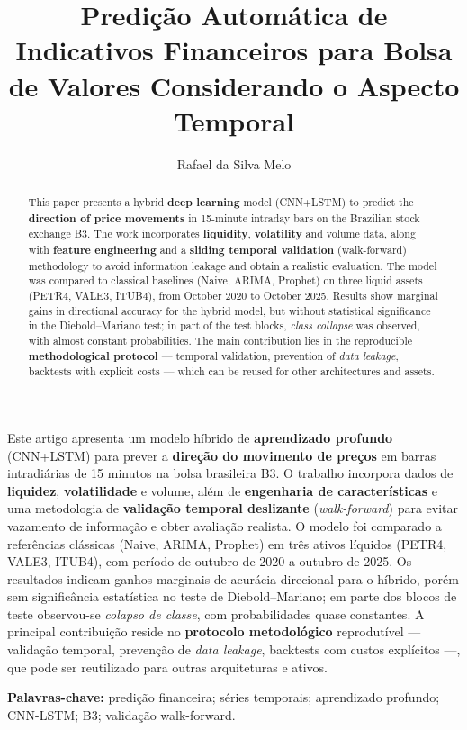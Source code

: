 \documentclass[12pt]{article}
\title{Predição Automática de Indicativos Financeiros para Bolsa de Valores Considerando o Aspecto Temporal}
\author{Rafael da Silva Melo\inst{1}}
\begin{document}
\maketitle

\begin{abstract}
  This paper presents a hybrid \textbf{deep learning} model (CNN+LSTM) to predict the \textbf{direction of price movements} in 15-minute intraday bars on the Brazilian stock exchange B3. The work incorporates \textbf{liquidity}, \textbf{volatility} and volume data, along with \textbf{feature engineering} and a \textbf{sliding temporal validation} (walk-forward) methodology to avoid information leakage and obtain a realistic evaluation. The model was compared to classical baselines (Naive, ARIMA, Prophet) on three liquid assets (PETR4, VALE3, ITUB4), from October 2020 to October 2025. Results show marginal gains in directional accuracy for the hybrid model, but without statistical significance in the Diebold--Mariano test; in part of the test blocks, \emph{class collapse} was observed, with almost constant probabilities. The main contribution lies in the reproducible \textbf{methodological protocol} --- temporal validation, prevention of \emph{data leakage}, backtests with explicit costs --- which can be reused for other architectures and assets.
\end{abstract}

\begin{resumo}
  Este artigo apresenta um modelo híbrido de \textbf{aprendizado profundo} (CNN+LSTM) para prever a \textbf{direção do movimento de preços} em barras intradiárias de 15 minutos na bolsa brasileira B3. O trabalho incorpora dados de \textbf{liquidez}, \textbf{volatilidade} e volume, além de \textbf{engenharia de características} e uma metodologia de \textbf{validação temporal deslizante} (\emph{walk-forward}) para evitar vazamento de informação e obter avaliação realista. O modelo foi comparado a referências clássicas (Naive, ARIMA, Prophet) em três ativos líquidos (PETR4, VALE3, ITUB4), com período de outubro de 2020 a outubro de 2025. Os resultados indicam ganhos marginais de acurácia direcional para o híbrido, porém sem significância estatística no teste de Diebold--Mariano; em parte dos blocos de teste observou-se \emph{colapso de classe}, com probabilidades quase constantes. A principal contribuição reside no \textbf{protocolo metodológico} reprodutível --- validação temporal, prevenção de \emph{data leakage}, backtests com custos explícitos ---, que pode ser reutilizado para outras arquiteturas e ativos.

  \vspace{0.5em}
  \noindent\textbf{Palavras-chave:} predição financeira; séries temporais; aprendizado profundo; CNN-LSTM; B3; validação walk-forward.
\end{resumo}







\end{document}
